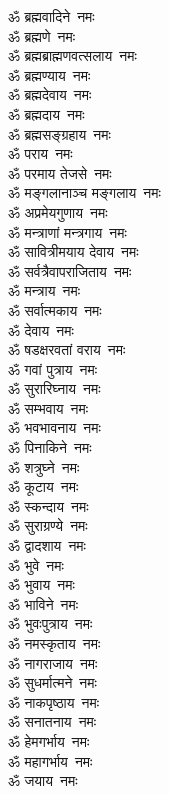 \begin{multicols}{2}
\begin{flushleft}
ॐ ब्रह्मवादिने~नमः\\
ॐ ब्रह्मणे~नमः\\
ॐ ब्रह्मब्राह्मणवत्सलाय~नमः\\
ॐ ब्रह्मण्याय~नमः\\
ॐ ब्रह्मदेवाय~नमः\\
ॐ ब्रह्मदाय~नमः\\
ॐ ब्रह्मसङ्ग्रहाय~नमः\\
ॐ पराय~नमः\\
ॐ परमाय तेजसे~नमः\\
ॐ मङ्गलानाञ्च मङ्गलाय~नमः\hfill{}\\
ॐ अप्रमेयगुणाय~नमः\\
ॐ मन्त्राणां मन्त्रगाय~नमः\\
ॐ सावित्रीमयाय देवाय~नमः\\
ॐ सर्वत्रैवापराजिताय~नमः\\
ॐ मन्त्राय~नमः\\
ॐ सर्वात्मकाय~नमः\\
ॐ देवाय~नमः\\
ॐ षडक्षरवतां वराय~नमः\\
ॐ गवां पुत्राय~नमः\\
ॐ सुरारिघ्नाय~नमः\hfill{}\\
ॐ सम्भवाय~नमः\\
ॐ भवभावनाय~नमः\\
ॐ पिनाकिने~नमः\\
ॐ शत्रुघ्ने~नमः\\
ॐ कूटाय~नमः\\
ॐ स्कन्दाय~नमः\\
ॐ सुराग्रण्ये~नमः\\
ॐ द्वादशाय~नमः\\
ॐ भुवे~नमः\\
ॐ भुवाय~नमः\hfill{}\\
ॐ भाविने~नमः\\
ॐ भुवःपुत्राय~नमः\\
ॐ नमस्कृताय~नमः\\
ॐ नागराजाय~नमः\\
ॐ सुधर्मात्मने~नमः\\
ॐ नाकपृष्ठाय~नमः\\
ॐ सनातनाय~नमः\\
ॐ हेमगर्भाय~नमः\\
ॐ महागर्भाय~नमः\\
ॐ जयाय~नमः\hfill{}\\

\end{flushleft}
\end{multicols}
